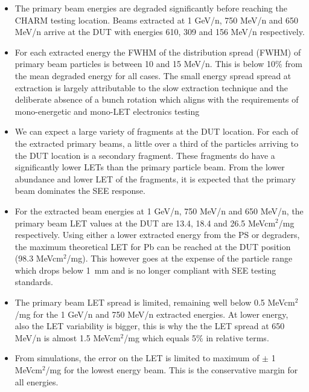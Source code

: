 \documentclass{cernatsnote}
\begin{document}
\begin{itemize}
    \item The primary beam energies are degraded significantly before reaching the CHARM testing location. Beams extracted at 1 GeV/n, 750 MeV/n and 650 MeV/n arrive at the DUT with energies 610, 309 and 156 MeV/n respectively.
    \item For each extracted energy the FWHM of the
distribution spread (FWHM) of primary beam particles is between 10 and 15 MeV/n. This is below 10\% from the mean degraded energy for all cases. The small energy spread spread at extraction is largely attributable to the slow extraction technique and the deliberate absence of a bunch rotation which aligns with the requirements of mono-energetic and mono-LET electronics testing
    \item We can expect a large
    variety of fragments at the DUT location. For each of the extracted primary beams,
    a little over a third of the particles arriving to the DUT location is a secondary
    fragment. These fragments do have a significantly lower LETs than the primary particle beam. From the lower abundance and lower LET of the fragments, it is expected that the primary beam dominates the SEE response.
    \item For the extracted beam energies at 1 GeV/n, 750 MeV/n and 650 MeV/n, the primary beam LET values at the DUT are 13.4, 18.4 and 26.5 MeVcm$^2$/mg respectively. Using either a lower extracted energy from the PS or degraders, the maximum theoretical LET for Pb can be reached at the DUT position (98.3 MeVcm$^2$/mg). This however goes at the expense of the particle range which drops below \SI{1}{mm} and is no longer compliant with SEE testing standards. 
    \item The primary beam LET spread is limited, remaining well below 0.5 MeVcm$^2$/mg for the 1 GeV/n and 750 MeV/n extracted energies. At lower energy, also the LET variability is bigger, this is why the the LET spread at 650 MeV/n is almost 1.5 MeVcm$^2$/mg which equals 5\% in relative terms.
    \item From simulations, the error on the LET is limited to maximum of $\pm$ 1 MeVcm$^2$/mg for the lowest energy beam. This is the conservative margin for all energies.
\end{itemize}
\end{document}
